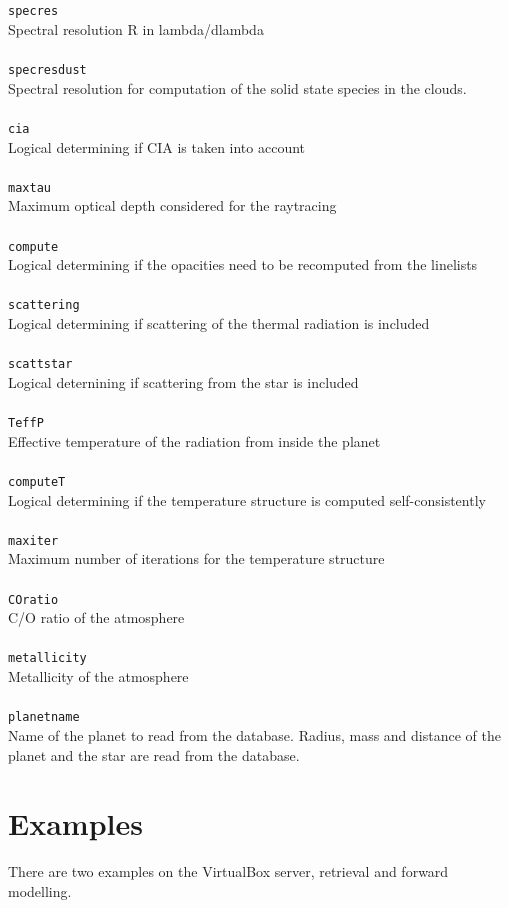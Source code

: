 \documentclass[12pt]{article}
\begin{document}
\\ \\
\texttt{specres}\\
Spectral resolution R in lambda/dlambda
\\ \\
\texttt{specresdust}\\
Spectral resolution for computation of the solid state species in the clouds.
\\ \\
\texttt{cia}\\
Logical determining if CIA is taken into account
\\ \\
\texttt{maxtau}\\
Maximum optical depth considered for the raytracing
\\ \\
\texttt{compute}\\
Logical determining if the opacities need to be recomputed from the linelists
\\ \\
\texttt{scattering}\\
Logical determining if scattering of the thermal radiation is included
\\ \\
\texttt{scattstar}\\
Logical deternining if scattering from the star is included
\\ \\
\texttt{TeffP}\\
Effective temperature of the radiation from inside the planet
\\ \\
\texttt{computeT}\\
Logical determining if the temperature structure is computed self-consistently
\\ \\
\texttt{maxiter}\\
Maximum number of iterations for the temperature structure
\\ \\
\texttt{COratio}\\
C/O ratio of the atmosphere
\\ \\
\texttt{metallicity}\\
Metallicity of the atmosphere
\\ \\
\texttt{planetname}\\
Name of the planet to read from the database. Radius, mass and distance of the planet and the star are read from the database.

\section{Examples}

There are two examples on the VirtualBox server, retrieval and forward modelling.
\end{document}
